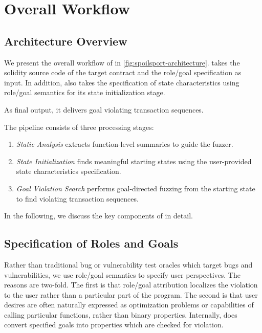 \section{Overall Workflow}
\label{ss:sec:overall_workflow}



\subsection{Architecture Overview}
We present the overall workflow of \spoilsport in \autoref{fig:spoilsport-architecture}.
\spoilsport takes the solidity source code of the target contract and the role/goal specification as input.
In addition, \spoilsport also takes the specification of state characteristics using role/goal semantics for its state initialization stage.

As final output, it delivers goal violating transaction sequences.

The pipeline consists of three processing stages:
\begin{enumerate}
    \item \textit{Static Analysis} extracts function-level summaries to guide the fuzzer.
    \item \textit{State Initialization} finds meaningful starting states using the user-provided state characteristics specification.
    \item \textit{Goal Violation Search} performs goal-directed fuzzing from the starting state to find violating transaction sequences.
\end{enumerate}

In the following, we discuss the key components of \spoilsport in detail. 

\subsection{Specification of Roles and Goals}
Rather than traditional bug or vulnerability test oracles which target bugs and vulnerabilities, we use role/goal semantics to specify user perspectives.
The reasons are two-fold. 
The first is that role/goal attribution localizes the violation to the user rather than a particular part of the program.
The second is that user desires are often naturally expressed as optimization problems or capabilities of calling particular functions, rather than binary properties.
Internally, \spoilsport does convert specified goals into properties which are checked for violation.

